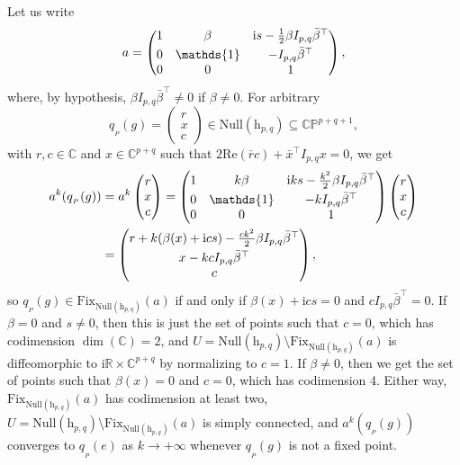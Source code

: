 \documentclass[10pt,a4paper]{amsart}
\numberwithin{equation}{section}
\theoremstyle{definition}
\begin{document}
Let us write \[a=\begin{pmatrix}1 & \beta & \mathrm{i}s-\tfrac{1}{2}\beta I_{p,q} \bar{\beta}^\top \vspace{1mm} \\ 0 & \mathds{1} & -I_{p,q}\bar{\beta}^\top \\ 0 & 0 & 1\end{pmatrix},\] where, by hypothesis, $\beta I_{p,q}\bar{\beta}^\top\neq 0$ if $\beta\neq 0$. For arbitrary \[q_{{}_P}(g)=\begin{pmatrix}r \\ x \\ c\end{pmatrix}\in\mathrm{Null}(\mathrm{h}_{p,q})\subseteq\mathbb{CP}^{p+q+1},\] with $r,c\in\mathbb{C}$ and $x\in\mathbb{C}^{p+q}$ such that $2\mathrm{Re}(\bar{r}c)+\bar{x}^\top I_{p,q}x=0$, we get
\begin{align*}a^k(q_{{}_P}(g)) & =a^k\begin{pmatrix}r \\ x \\ c\end{pmatrix}=\begin{pmatrix}1 & k\beta & \mathrm{i}ks-\tfrac{k^2}{2}\beta I_{p,q} \bar{\beta}^\top \vspace{1mm}\\ 0 & \mathds{1} & -kI_{p,q}\bar{\beta}^\top \\ 0 & 0 & 1\end{pmatrix}\begin{pmatrix}r \\ x \\ c\end{pmatrix} \\ & =\begin{pmatrix}r+k(\beta(x)+\mathrm{i}cs)-\tfrac{ck^2}{2}\beta I_{p,q}\bar{\beta}^\top \vspace{1mm}\\ x-kcI_{p,q}\bar{\beta}^\top \\ c\end{pmatrix},
\end{align*} so $q_{{}_P}(g)\in\mathrm{Fix}_{\mathrm{Null}(\mathrm{h}_{p,q})}(a)$ if and only if $\beta(x)+\mathrm{i}cs=0$ and $cI_{p,q}\bar{\beta}^\top=0$.
If $\beta=0$ and $s\neq 0$, then this is just the set of points such that $c=0$, which has codimension $\dim(\mathbb{C})=2$, and $U=\mathrm{Null}(\mathrm{h}_{p,q})\setminus\mathrm{Fix}_{\mathrm{Null}(\mathrm{h}_{p,q})}(a)$ is diffeomorphic to $\mathrm{i}\mathbb{R}\times\mathbb{C}^{p+q}$ by normalizing to $c=1$. If $\beta\neq 0$, then we get the set of points such that $\beta(x)=0$ and $c=0$, which has codimension 4. Either way, $\mathrm{Fix}_{\mathrm{Null}(\mathrm{h}_{p,q})}(a)$ has codimension at least two, $U=\mathrm{Null}(\mathrm{h}_{p,q})\setminus\mathrm{Fix}_{\mathrm{Null}(\mathrm{h}_{p,q})}(a)$ is simply connected, and $a^k(q_{{}_P}(g))$ converges to $q_{{}_P}(e)$ as $k\rightarrow+\infty$ whenever $q_{{}_P}(g)$ is not a fixed point.
\end{document}
